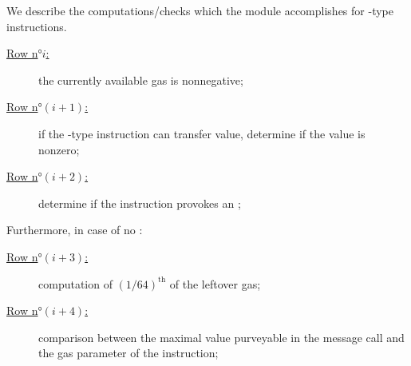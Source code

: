 We describe the computations/checks which the \stpMod{} module accomplishes for -type instructions.
\begin{description}
	\item[\colorbox{solarized-orange}{\underline{Row n$°i$:}}] the currently available gas is nonnegative;
	\item[\colorbox{solarized-orange}{\underline{Row n$°(i + 1)$:}}] if the -type instruction can transfer value, determine if the value is nonzero;
	\item[\colorbox{solarized-orange}{\underline{Row n$°(i + 2)$:}}] determine if the instruction provokes an \oogxSH{};
\end{description}
Furthermore, in case of no \oogxSH{}:
\begin{description}
	\item[\colorbox{solarized-green} {\underline{Row n$°(i + 3)$:}}] computation of $(1/64)^\text{th}$ of the leftover gas;
	\item[\colorbox{solarized-green} {\underline{Row n$°(i + 4)$:}}] comparison between the maximal value purveyable in the message call and the gas parameter of the instruction;
\end{description}

